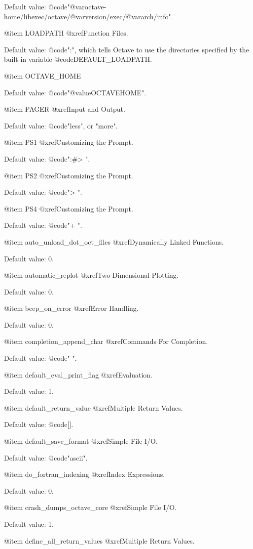 Default value: @code{"@var{octave-home}/libexec/octave/@var{version}/exec/@var{arch}/info"}.

@item LOADPATH
@xref{Function Files}.

Default value: @code{":"}, which tells Octave to use the directories
specified by the built-in variable @code{DEFAULT_LOADPATH}.

@item OCTAVE_HOME

Default value: @code{"@value{OCTAVEHOME}"}.

@item PAGER
@xref{Input and Output}.

Default value: @code{"less", or "more"}.

@item PS1
@xref{Customizing the Prompt}.

Default value: @code{"\s:\#> "}.

@item PS2
@xref{Customizing the Prompt}.

Default value: @code{"> "}.

@item PS4
@xref{Customizing the Prompt}.

Default value: @code{"+ "}.

@item auto_unload_dot_oct_files
@xref{Dynamically Linked Functions}.

Default value: 0.

@item automatic_replot
@xref{Two-Dimensional Plotting}.

Default value: 0.

@item beep_on_error
@xref{Error Handling}.

Default value: 0.

@item completion_append_char
@xref{Commands For Completion}.

Default value: @code{" "}.

@item default_eval_print_flag
@xref{Evaluation}.

Default value: 1.

@item default_return_value
@xref{Multiple Return Values}.

Default value: @code{[]}.

@item default_save_format
@xref{Simple File I/O}.

Default value: @code{"ascii"}.

@item do_fortran_indexing
@xref{Index Expressions}.

Default value: 0.

@item crash_dumps_octave_core
@xref{Simple File I/O}.

Default value: 1.

@item define_all_return_values
@xref{Multiple Return Values}.

